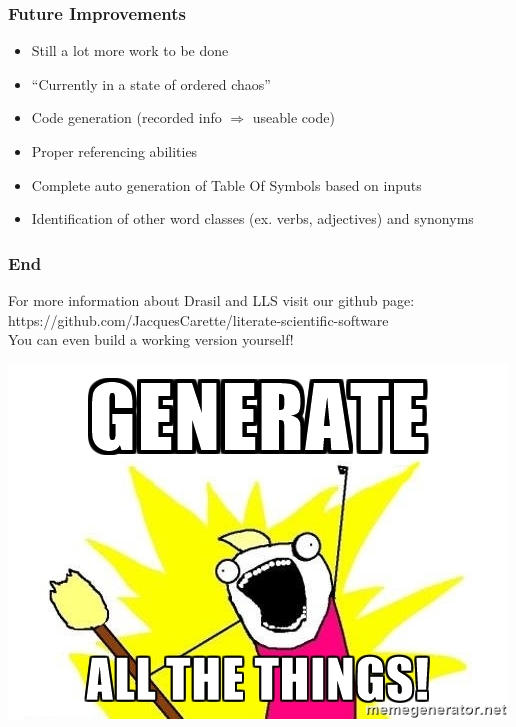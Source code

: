 \documentclass{beamer}
\begin{document}
\begin{frame}
\frametitle{Future Improvements}
\begin{itemize}
 \item<1-> Still a lot more work to be done\newline
 \item<2-> ``Currently in a state of ordered chaos''\newline
 \item<3-> Code generation (recorded info $\Rightarrow$ useable code)\newline
 \item<4-> Proper referencing abilities\newline
 \item<5-> Complete auto generation of Table Of Symbols based on inputs\newline
 \item<6-> Identification of other word classes (ex. verbs, adjectives) and synonyms
\end{itemize}
\end{frame}

\begin{frame}
\frametitle{End}
For more information about Drasil and LLS visit our github page: \\
https://github.com/JacquesCarette/literate-scientific-software \\
\alert{You can even build a working version yourself!}
\newline
\newline
\begin{center}
\includegraphics[scale=0.5]{../WG2_11/generate_all_the_things.jpg}
\end{center}
\end{frame}
\end{document}
